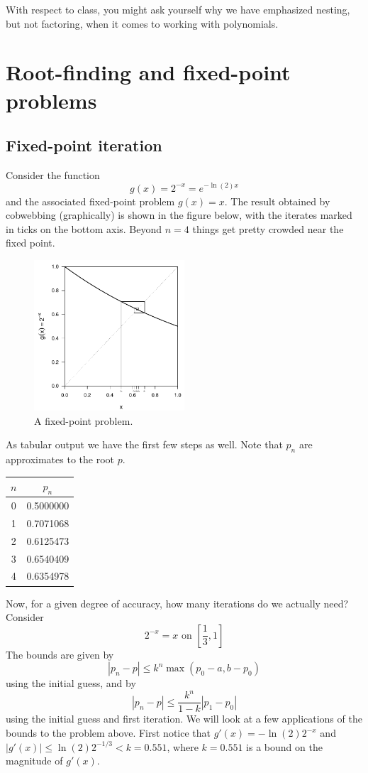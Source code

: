 \documentclass[11pt]{article}
\begin{document}
\noindent With respect to class, you might ask yourself why we have emphasized nesting, but not factoring, when it comes to working with polynomials.

\clearpage
\section{Root-finding and fixed-point problems}
\subsection{Fixed-point iteration}

Consider the function \[g(x) = 2^{-x} = e^{-\ln(2)x}\] and the associated fixed-point problem \(g(x) = x\). The result obtained by cobwebbing (graphically) is shown in the figure below, with the iterates marked in ticks on the bottom axis. Beyond \(n=4\) things get pretty crowded near the fixed point.
%
\begin{figure}[ht!]\centering
\includegraphics[width=0.5\textwidth]{1_basics/fixedpoint.pdf}
\caption{A fixed-point problem.}\label{fig::fpp}
\end{figure}
%
As tabular output we have the first few steps as well. Note that \(p_n\) are approximates to the root \(p\).
\begin{center}
\begin{tabular}{cc}
\(n\) & \(p_n\)\\
\hline\hline
0 & 0.5000000\\
1 & 0.7071068\\
2 & 0.6125473\\
3 & 0.6540409\\
4 & 0.6354978
\end{tabular}
\end{center}

Now, for a given degree of accuracy, how many iterations do we actually need? Consider \[2^{-x}=x\text{ on }\left[\frac{1}{3}, 1\right]\] The bounds are given by \[|p_n-p|\leq k^n \max(p_0-a, b - p_0)\]
using the initial guess, and by \[|p_n-p|\leq\frac{k^n}{1-k}|p_1-p_0|\] using the initial guess and first iteration. We will look at a few applications of the bounds to the problem above. First notice that \(g'(x) = -\ln(2)2^{-x}\) and \(|g'(x)| \leq \ln(2)2^{-{1}/{3}} < k = 0.551\), where \(k = 0.551\) is a bound on the magnitude of \(g'(x)\).
\end{document}
